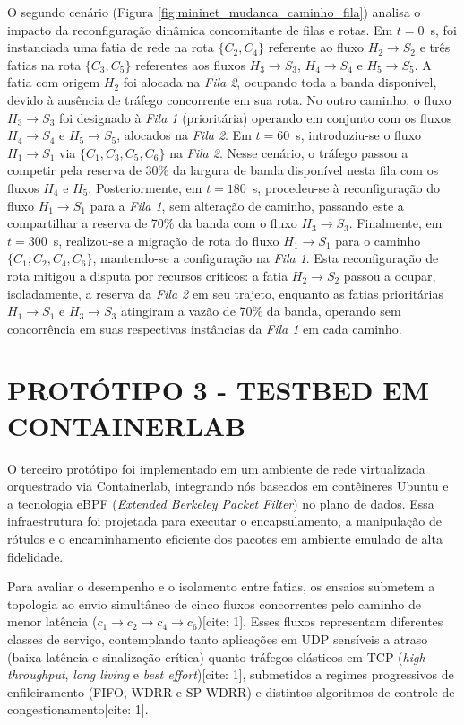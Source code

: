 O segundo cenário (Figura \ref{fig:mininet_mudanca_caminho_fila}) analisa o impacto da reconfiguração dinâmica concomitante de filas e rotas. %
Em $t=0$~s, foi instanciada uma fatia de rede na rota $\{C_2, C_4\}$ referente ao fluxo $H_2 \rightarrow S_2$ e três fatias na rota $\{C_3, C_5\}$ referentes aos fluxos $H_3 \rightarrow S_3$, $H_4 \rightarrow S_4$ e $H_5 \rightarrow S_5$. A fatia com origem $H_2$ foi alocada na \textit{Fila 2}, ocupando toda a banda disponível, devido à ausência de tráfego concorrente em sua rota. No outro caminho, o fluxo $H_3 \rightarrow S_3$ foi designado à \textit{Fila 1} (prioritária) operando em conjunto com os fluxos $H_4 \rightarrow S_4$ e $H_5 \rightarrow S_5$, alocados na \textit{Fila 2}.
%
Em $t=60$~s, introduziu-se o fluxo $H_1 \rightarrow S_1$ via $\{C_1, C_3, C_5, C_6\}$ na \textit{Fila 2}. Nesse cenário, o tráfego passou a competir pela reserva de 30\% da largura de banda disponível nesta fila com os fluxos $H_4$ e $H_5$. Posteriormente, em $t=180$~s, procedeu-se à reconfiguração do fluxo $H_1 \rightarrow S_1$ para a \textit{Fila 1}, sem alteração de caminho, passando este a compartilhar a reserva de 70\% da banda com o fluxo $H_3 \rightarrow S_3$.
%
Finalmente, em $t=300$~s, realizou-se a migração de rota do fluxo $H_1 \rightarrow S_1$ para o caminho $\{C_1, C_2, C_4, C_6\}$, mantendo-se a configuração na \textit{Fila 1}. Esta reconfiguração de rota mitigou a disputa por recursos críticos: a fatia $H_2 \rightarrow S_2$ passou a ocupar, isoladamente, a reserva da \textit{Fila 2} em seu trajeto, enquanto as fatias prioritárias $H_1 \rightarrow S_1$ e $H_3 \rightarrow S_3$ atingiram a vazão de 70\% da banda, operando sem concorrência em suas respectivas instâncias da \textit{Fila 1} em cada caminho.

\section{PROTÓTIPO 3 - TESTBED EM CONTAINERLAB}

O terceiro protótipo foi implementado em um ambiente de rede virtualizada orquestrado via Containerlab, integrando nós baseados em contêineres Ubuntu e a tecnologia eBPF (\textit{Extended Berkeley Packet Filter}) no plano de dados. Essa infraestrutura foi projetada para executar o encapsulamento, a manipulação de rótulos e o encaminhamento eficiente dos pacotes em ambiente emulado de alta fidelidade.

Para avaliar o desempenho e o isolamento entre fatias, os ensaios submetem a topologia ao envio simultâneo de cinco fluxos concorrentes pelo caminho de menor latência ($c_1 \rightarrow c_2 \rightarrow c_4 \rightarrow c_6$)[cite: 1]. Esses fluxos representam diferentes classes de serviço, contemplando tanto aplicações em UDP sensíveis a atraso (baixa latência e sinalização crítica) quanto tráfegos elásticos em TCP (\textit{high throughput}, \textit{long living} e \textit{best effort})[cite: 1], submetidos a regimes progressivos de enfileiramento (FIFO, WDRR e SP-WDRR) e distintos algoritmos de controle de congestionamento[cite: 1].

